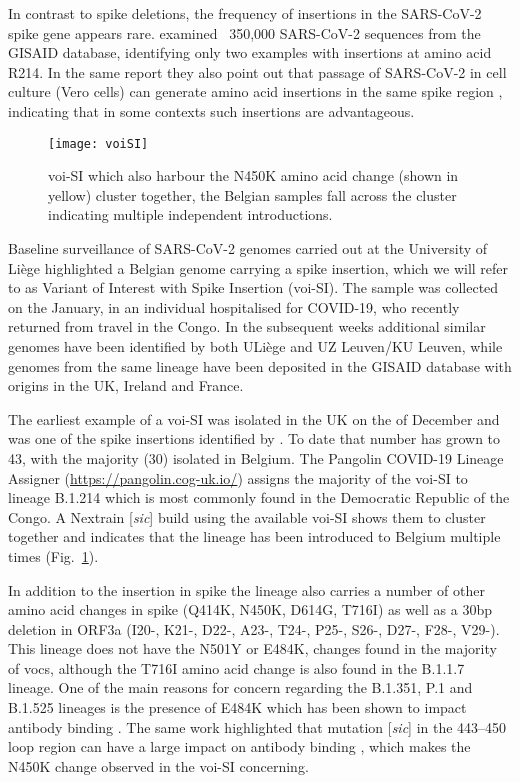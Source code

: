 In contrast to spike deletions, the frequency of insertions in the SARS-CoV-2 spike gene appears rare. \citet{garry2021spike} examined ~350,000 SARS-CoV-2 sequences from the GISAID database, identifying only two examples with insertions at amino acid R214.
In the same report they also point out that passage of SARS-CoV-2 in cell culture (Vero cells) can generate amino acid insertions in the same spike region \citep{garry2021spike}, indicating that in some contexts such insertions are advantageous.

\begin{figure}[ht]
  \centering
  \texttt{[image: voiSI]}
  \caption[VOI-SI monitoring]{\gls{voi}-SI which also harbour the N450K amino acid change (shown in yellow) cluster together, the Belgian samples fall across the cluster indicating multiple independent introductions.}
  \label{fig:voiSI}
\end{figure}

Baseline surveillance of SARS-CoV-2 genomes carried out at the University of Li\`{e}ge highlighted a Belgian genome carrying a spike insertion, which we will refer to as Variant of Interest with Spike Insertion (\gls{voi}-SI).
The sample was collected on the  January, in an individual hospitalised for COVID-19, who recently returned from travel in the Congo.
In the subsequent weeks additional similar genomes have been identified by both ULi\`{e}ge and UZ Leuven/KU Leuven, while genomes from the same lineage have been deposited in the GISAID database with origins in the UK, Ireland and France.

The earliest example of a \gls{voi}-SI was isolated in the UK on the  of December and was one of the spike insertions identified by \citet{garry2021spike}.
To date that number has grown to 43, with the majority (30) isolated in Belgium.
The Pangolin COVID-19 Lineage Assigner (\url{https://pangolin.cog-uk.io/}) assigns the majority of the \gls{voi}-SI to lineage B.1.214 which is most commonly found in the Democratic Republic of the Congo.
A Nextrain [\textit{sic}] build using the available \gls{voi}-SI shows them to cluster together and indicates that the lineage has been introduced to Belgium multiple times (Fig.~\ref{fig:voiSI}).

In addition to the insertion in spike the lineage also carries a number of other amino acid changes in spike (Q414K, N450K, D614G, T716I) as well as a 30bp deletion in ORF3a (I20-, K21-, D22-, A23-, T24-, P25-, S26-, D27-, F28-, V29-).
This lineage does not have the N501Y or E484K, changes found in the majority of \gls{voc}s, although the T716I amino acid change is also found in the B.1.1.7 lineage.
One of the main reasons for concern regarding the B.1.351, P.1 and B.1.525 lineages is the presence of E484K which has been shown to impact antibody binding \citep{greaney2021comprehensive}.
The same work highlighted that mutation [\textit{sic}] in the 443--450 loop region can have a large impact on antibody binding \citep{greaney2021comprehensive}, which makes the N450K change observed in the \gls{voi}-SI concerning.

